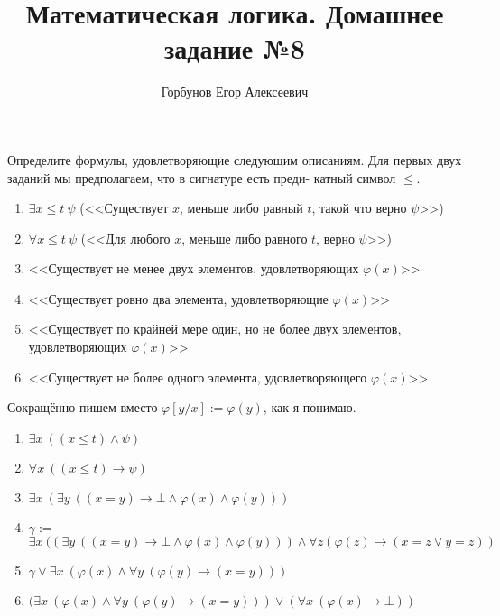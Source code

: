 


\title{Математическая логика. Домашнее задание №8}
\author{Горбунов Егор Алексеевич}


\maketitle

\begin{task}[1]
	Определите формулы, удовлетворяющие следующим описаниям. Для
	первых двух заданий мы предполагаем, что в сигнатуре есть преди-
	катный символ $\leq$.
	\begin{enumerate}
		\item $\exists x \leq t\ \psi$ (<<Существует $x$, меньше либо равный $t$, такой что верно $\psi$>>)
		\item $\forall x \leq t\ \psi$ (<<Для любого $x$, меньше либо равного $t$, верно $\psi$>>)
		\item <<Существует не менее двух элементов, удовлетворяющих $\varphi(x)$>>
		\item <<Существует ровно два элемента, удовлетворяющие $\varphi(x)$>>
		\item <<Существует по крайней мере один, но не более двух элементов, удовлетворяющих $\varphi(x)$>>
		\item <<Существует не более одного элемента, удовлетворяющего $\varphi(x)$>>
	\end{enumerate}
\end{task}
\begin{solution}
Сокращённо пишем вместо $\varphi[y/x] := \varphi(y)$, как я понимаю.
\begin{enumerate}
	\item $\exists x\ ((x \leq t) \land \psi)$
	\item $\forall x\ ((x \leq t) \to \psi)$
	\item $\exists x\ (\exists y\ ((x = y) \to \bot \land \varphi(x) \land \varphi(y)))$
	\item $\gamma :=$ $\exists x\ ((\exists y\ ((x = y) \to \bot \land \varphi(x) \land \varphi(y))) \land \forall z (\varphi(z) \to (x = z \lor y = z))$
	\item $\gamma \lor \exists x\ (\varphi(x) \land \forall y\ (\varphi(y) \to (x = y)))$
	\item $(\exists x\ (\varphi(x) \land \forall y\ (\varphi(y) \to (x = y))) \lor (\forall x\ (\varphi(x) \to \bot))$
\end{enumerate}
\end{solution}

